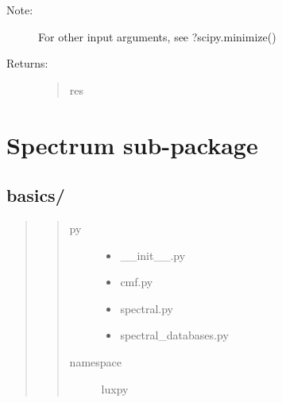 \documentclass[letterpaper,10pt,english]{sphinxmanual}
\begin{document}
\begin{fulllineitems}
\begin{description}
\begin{quote}
\begin{description}
\end{description}\end{quote}

\item[{Note:}] \leavevmode
For other input arguments, see ?scipy.minimize()

\item[{Returns:}] \leavevmode\begin{quote}\begin{description}
\item[{res}] \leavevmode
{}

\end{description}\end{quote}

\end{description}

\end{fulllineitems}



\section{Spectrum sub-package}
\label{\detokenize{spectrum:spectrum-sub-package}}\label{\detokenize{spectrum::doc}}

\subsection{basics/}
\label{\detokenize{spectrum:basics}}\begin{quote}
\begin{quote}\begin{description}
\item[{py}] \leavevmode\begin{itemize}
\item {} 
\_\_init\_\_.py

\item {} 
cmf.py

\item {} 
spectral.py

\item {} 
spectral\_databases.py

\end{itemize}

\item[{namespace}] \leavevmode
luxpy

\end{description}\end{quote}
\end{quote}
\label{\detokenize{spectrum:module-luxpy.spectrum}}
\end{document}
